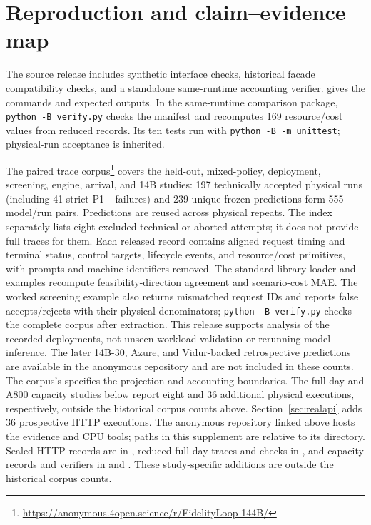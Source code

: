 \appendix
\section{Reproduction and claim--evidence map}
The source release includes synthetic interface checks, historical facade
compatibility checks, and a standalone same-runtime accounting verifier.
 gives the commands and expected outputs. In the same-runtime comparison package,
\texttt{python -B verify.py} checks the manifest and recomputes 169 resource/cost
values from reduced records. Its ten tests run with
\texttt{python -B -m unittest}; physical-run acceptance is inherited.

The paired trace corpus\footnote{\url{https://anonymous.4open.science/r/FidelityLoop-144B/}}
covers the held-out, mixed-policy, deployment, screening, engine, arrival,
and 14B studies:
197 technically accepted physical runs (including 41 strict P1+ failures)
and 239 unique frozen predictions form 555 model/run pairs. Predictions are
reused across physical repeats. The index separately lists eight excluded
technical or aborted attempts; it does not provide full traces for them.
Each released record contains aligned request timing and terminal status,
control targets, lifecycle events, and resource/cost primitives, with prompts
and machine identifiers removed. The standard-library loader and examples
recompute feasibility-direction agreement and scenario-cost MAE.
The worked screening example also returns mismatched request IDs and reports
false accepts/rejects with their physical denominators;
\texttt{python -B verify.py} checks the complete corpus after extraction.
This release supports analysis of the recorded deployments, not unseen-workload
validation or rerunning model inference. The later 14B-30, Azure, and Vidur-backed retrospective predictions are
available in the anonymous repository and are not included in these counts. The corpus's  specifies the projection
and accounting boundaries.
The full-day and A800 capacity studies below report eight and 36 additional
physical executions, respectively, outside the historical corpus counts above.
Section~\ref{sec:realapi} adds 36 prospective HTTP executions.
The anonymous repository linked above hosts the evidence and CPU tools;
 paths in this supplement are relative to its 
directory. Sealed HTTP records are in ,
reduced full-day traces and checks in , and capacity
records and verifiers in  and
. These study-specific additions are outside
the historical corpus counts.


